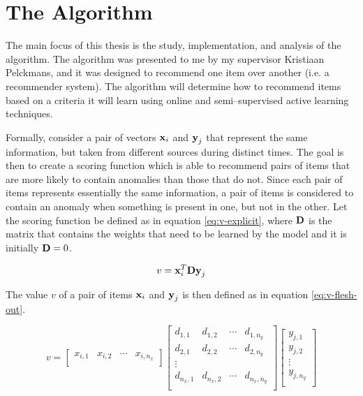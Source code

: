 \section{The \mlblink Algorithm} \label{sect:theory:ml-blink}

The main focus of this thesis is the study, implementation, and analysis of the \mlblink algorithm. The \mlblink algorithm was presented to me by my supervisor Kristiaan Pelckmans, and it was designed to recommend one item over another (i.e. a recommender system). The \mlblink algorithm will determine how to recommend items based on a criteria it will learn using online and semi--supervised active learning techniques.  \newline

Formally, consider a pair of vectors $\boldsymbol{\mathbf{x}}_i$ and $\boldsymbol{\mathbf{y}}_j$ that represent the same information, but taken from different sources during distinct times. The goal is then to create a scoring function which is able to recommend pairs of items that are more likely to contain anomalies than those that do not. Since each pair of items represents essentially the same information, a pair of items is considered to contain an anomaly when something is present in one, but not in the other. Let the scoring function be defined as in equation \ref{eq:v-explicit}, where $\boldsymbol{\mathbf{D}}$ is the matrix that contains the weights that need to be learned by the model and it is initially $\boldsymbol{\mathbf{D}} = 0$.

\begin{equation} \label{eq:v-explicit}
  v = \boldsymbol{\mathbf{x}}_{i}^{T} \boldsymbol{\mathbf{D}} \boldsymbol{\mathbf{y}}_j  
\end{equation}

The value $v$ of a pair of items $\boldsymbol{\mathbf{x}}_i$ and $\boldsymbol{\mathbf{y}}_j$ is then defined as in equation \ref{eq:v-flesh-out}.

\begin{equation} \label{eq:v-flesh-out}
    v = 
    \begin{bmatrix}
        x_{i,1} & x_{i,2} & \cdots & x_{i,n_x} \\
    \end{bmatrix}
    \begin{bmatrix}
        d_{1,1} & d_{1,2} & \cdots & d_{1,n_y} \\
        d_{2,1} & d_{2,2} & \cdots & d_{2,n_y} \\
        \vdots \\
        d_{n_x,1} & d_{n_x,2} & \cdots & d_{n_x,n_y} \\
    \end{bmatrix}
    \begin{bmatrix}
        y_{j,1} \\
        y_{j,2} \\
        \vdots  \\
        y_{j,n_y} \\
    \end{bmatrix}
\end{equation}


